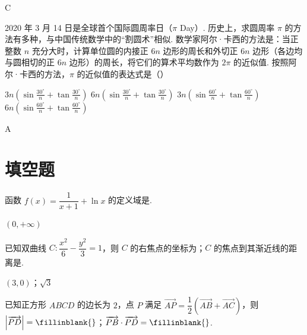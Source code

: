 \begin{answer}
C
\end{answer}

\begin{problem}
2020 年 3 月 14 日是全球首个国际圆周率日（\(\pi\) Day）. 历史上，求圆周率 \(\pi\) 的方法有多种，与中国传统数学中的“割圆术”相似. 数学家阿尔·卡西的方法是：当正整数 \(n\) 充分大时，计算单位圆的内接正 \(6n\) 边形的周长和外切正 \(6n\) 边形（各边均与圆相切的正 \(6n\) 边形）的周长，将它们的算术平均数作为 \(2\pi\) 的近似值. 按照阿尔·卡西的方法，\(\pi\) 的近似值的表达式是（\quad）

\choices
    {\(3n\left(\sin\frac{30^\circ}{n}+\tan\frac{30^\circ}{n}\right)\)}
    {\(6n\left(\sin\frac{30^\circ}{n}+\tan\frac{30^\circ}{n}\right)\)}
    {\(3n\left(\sin\frac{60^\circ}{n}+\tan\frac{60^\circ}{n}\right)\)}
    {\(6n\left(\sin\frac{60^\circ}{n}+\tan\frac{60^\circ}{n}\right)\)}
\end{problem}

\begin{answer}
A
\end{answer}

\section{填空题}

\begin{problem}
函数 \(f(x)=\dfrac{1}{x+1}+\ln x\) 的定义域是\fillinblank{}.
\end{problem}

\begin{answer}
\((0,+\infty)\)
\end{answer}

\begin{problem}
已知双曲线 \(C:\dfrac{x^2}{6}-\dfrac{y^2}{3}=1\)，则 \(C\) 的右焦点的坐标为\fillinblank{}；\(C\) 的焦点到其渐近线的距离是\fillinblank{}.
\end{problem}

\begin{answer}
\((3,0)\)；\(\sqrt{3}\)
\end{answer}

\begin{problem}
已知正方形 \(ABCD\) 的边长为 \(2\)，点 \(P\) 满足 \(\overrightarrow{AP}=\dfrac12\left(\overrightarrow{AB}+\overrightarrow{AC}\right)\)，则 \(\left|\overrightarrow{PD}\right|=\fillinblank{}\)；\(\overrightarrow{PB}\cdot\overrightarrow{PD}=\fillinblank{}\).
\end{problem}

